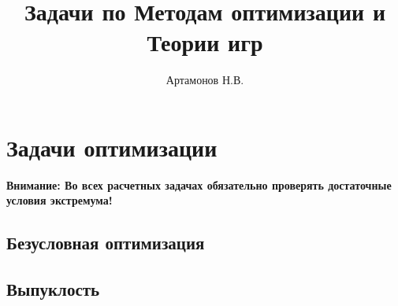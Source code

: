 \documentclass[12pt]{article}
\title{Задачи по Методам оптимизации и Теории игр}
\author{Артамонов Н.В.}
\theoremstyle{remark}
\begin{document}
\maketitle

\tableofcontents

\section{Задачи оптимизации}

\textbf{Внимание: Во всех расчетных задачах обязательно проверять достаточные условия экстремума!}

\subsection{Безусловная оптимизация}



\subsection{Выпуклость}


\end{document}
